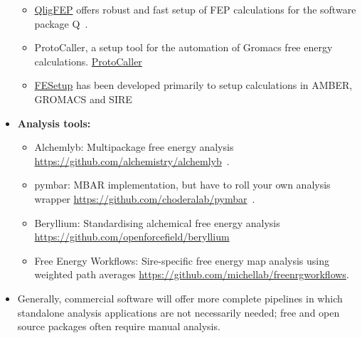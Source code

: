 \documentclass[9pt,bestpractices]{livecoms}
\begin{document}
\begin{itemize}
\begin{itemize}
	\item \href{https://github.com/qusers/qligfep}{QligFEP} offers robust and fast setup of FEP calculations for the software package Q~\cite{jespers2019qligfep}.
	\item ProtoCaller, a setup tool for the automation of Gromacs free energy calculations. \href{https://github.com/protocaller/ProtoCaller}{ProtoCaller}~\cite{suruzhon2020protocaller}
	\item \href{https://fesetup.readthedocs.io/en/latest/introduction.html}{FESetup} has been developed primarily to setup calculations in AMBER, GROMACS and SIRE~\cite{loeffler2015fesetup}
	\end{itemize}
\item []\textbf{Analysis tools:}
	\begin{itemize}

	\item Alchemlyb: Multipackage free energy analysis
	\url{https://github.com/alchemistry/alchemlyb}~\cite{daviddotson2020alchemistry}.
	\item pymbar: MBAR implementation, but have to roll your own analysis wrapper
	\url{https://github.com/choderalab/pymbar}~\cite{shirts2008statistically}.
	\item Beryllium: Standardising alchemical free energy analysis \url{https://github.com/openforcefield/beryllium}
	\item Free Energy Workflows: Sire-specific free energy map analysis using weighted path averages \url{https://github.com/michellab/freenrgworkflows}.
	\end{itemize}
\item[] Generally, commercial software will offer more complete pipelines in which standalone analysis applications are not necessarily needed; free and open source packages often require manual analysis.
\end{itemize}


\end{document}
